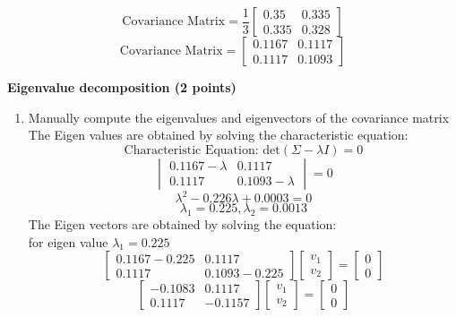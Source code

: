 \documentclass[a3paper,12pt]{extarticle} %
\begin{document}
\begin{enumerate}
\begin{enumerate}
\[    \]
    \[
    \text{Covariance Matrix} = \frac{1}{3} \begin{bmatrix}0.35  & 0.335\\0.335 & 0.328\end{bmatrix}
    \]
    \[
    \text{Covariance Matrix} = \begin{bmatrix}0.1167  & 0.1117\\0.1117 & 0.1093\end{bmatrix}
    \]
    \end{enumerate}
    \subitem \textbf{Eigenvalue decomposition (2 points)}
    \begin{enumerate}
        \item Manually compute the eigenvalues and eigenvectors of the covariance matrix
        \\ The Eigen values are obtained by solving the characteristic equation:
        \[
        \text{Characteristic Equation: } \text{det}(\Sigma - \lambda I) = 0
        \]
        \[
        \begin{vmatrix}0.1167 - \lambda & 0.1117\\0.1117 & 0.1093 - \lambda\end{vmatrix} = 0
        \]
        \[
        \lambda^2 - 0.226\lambda + 0.0003 = 0
        \]
        \[
        \lambda_1 = 0.225, \lambda_2 = 0.0013
        \]
        The Eigen vectors are obtained by solving the equation:
        \\ for eigen value \(\lambda_1 = 0.225\)
        \[
            \begin{bmatrix}0.1167 - 0.225 & 0.1117\\0.1117 & 0.1093 - 0.225\end{bmatrix} \begin{bmatrix}v_1\\v_2\end{bmatrix} = \begin{bmatrix}0\\0\end{bmatrix}
        \]
        \[
            \begin{bmatrix}-0.1083 & 0.1117\\0.1117 & -0.1157\end{bmatrix} \begin{bmatrix}v_1\\v_2\end{bmatrix} = \begin{bmatrix}0\\0\end{bmatrix}
        \]
        \[
\]
\end{enumerate}
\end{enumerate}
\end{document}
